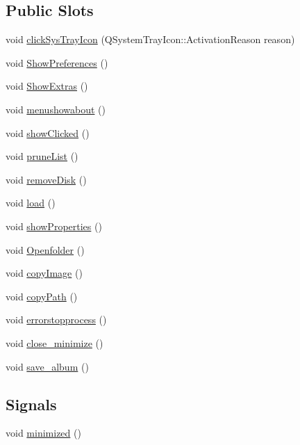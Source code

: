 \subsection*{Public Slots}
\begin{DoxyCompactItemize}
\item 
void \hyperlink{classMainWindow_a571e513ee5005742161fd4de81c86ca2}{clickSysTrayIcon} (QSystemTrayIcon::ActivationReason reason)
\item 
void \hyperlink{classMainWindow_a7aec36163c9dfeda7da43b3e0854d673}{ShowPreferences} ()
\item 
void \hyperlink{classMainWindow_ae3130ae3dcc5f6261fb633f52ec062a7}{ShowExtras} ()
\item 
void \hyperlink{classMainWindow_a95d7c8c04e09437afc222121d383a722}{menushowabout} ()
\item 
void \hyperlink{classMainWindow_ac2a292cdcf39848ec42e6352f011ddd1}{showClicked} ()
\item 
void \hyperlink{classMainWindow_a202e9111e76a514c151fffa424b01b73}{pruneList} ()
\item 
void \hyperlink{classMainWindow_aea6d2dc29c9cb6f4848a540ba3e5007e}{removeDisk} ()
\item 
void \hyperlink{classMainWindow_a692f2f28196cc9ee41b10e89c5d32922}{load} ()
\item 
void \hyperlink{classMainWindow_a4da9a80d3c5a312dde4fa246436d100f}{showProperties} ()
\item 
void \hyperlink{classMainWindow_a3b43993780b5d104db3472ce7e9180e6}{Openfolder} ()
\item 
void \hyperlink{classMainWindow_a0d88444127f5f56a4db14d850938dfb6}{copyImage} ()
\item 
void \hyperlink{classMainWindow_a5dfecbc3190aaa5b1d4ff5fe84f8c12b}{copyPath} ()
\item 
void \hyperlink{classMainWindow_a463ad5b4c5ca193c1ba13247bedcfaca}{errorstopprocess} ()
\item 
void \hyperlink{classMainWindow_a2f76e8dbbe9eca94d07919786a7c5108}{close\_\-minimize} ()
\item 
void \hyperlink{classMainWindow_ae50efe3540a13d96ec86c677ad56880c}{save\_\-album} ()
\end{DoxyCompactItemize}
\subsection*{Signals}
\begin{DoxyCompactItemize}
\item 
void \hyperlink{classMainWindow_a3b1f97543263266499a860cbb03b71fb}{minimized} ()
\end{DoxyCompactItemize}
